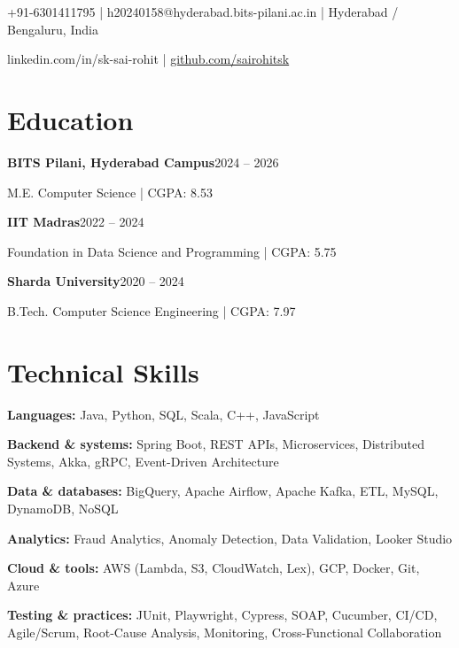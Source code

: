 \documentclass[a4paper,11pt]{article}
\begin{document}
\fontsize{10.5}{13}\selectfont

{\par\vspace{5pt}
+91-6301411795 | h20240158@hyderabad.bits-pilani.ac.in | Hyderabad / Bengaluru, India\par\vspace{2pt}
linkedin.com/in/sk-sai-rohit | \href{https://github.com/sairohitsk}{github.com/sairohitsk}\par}
\section{Education}
\textbf{BITS Pilani, Hyderabad Campus}\hfill 2024 -- 2026\par\nopagebreak[4]
M.E. Computer Science | CGPA: 8.53\par\addvspace{2pt}
\textbf{IIT Madras}\hfill 2022 -- 2024\par\nopagebreak[4]
Foundation in Data Science and Programming | CGPA: 5.75\par\addvspace{2pt}
\textbf{Sharda University}\hfill 2020 -- 2024\par\nopagebreak[4]
B.Tech. Computer Science Engineering | CGPA: 7.97\par\addvspace{2pt}
\section{Technical Skills}
\textbf{Languages:} Java, Python, SQL, Scala, C++, JavaScript\par\addvspace{2pt}
\textbf{Backend \& systems:} Spring Boot, REST APIs, Microservices, Distributed Systems, Akka, gRPC, Event-Driven Architecture\par\addvspace{2pt}
\textbf{Data \& databases:} BigQuery, Apache Airflow, Apache Kafka, ETL, MySQL, DynamoDB, NoSQL\par\addvspace{2pt}
\textbf{Analytics:} Fraud Analytics, Anomaly Detection, Data Validation, Looker Studio\par\addvspace{2pt}
\textbf{Cloud \& tools:} AWS (Lambda, S3, CloudWatch, Lex), GCP, Docker, Git, Azure\par\addvspace{2pt}
\textbf{Testing \& practices:} JUnit, Playwright, Cypress, SOAP, Cucumber, CI/CD, Agile/Scrum, Root-Cause Analysis, Monitoring, Cross-Functional Collaboration\par\addvspace{2pt}
\end{document}
